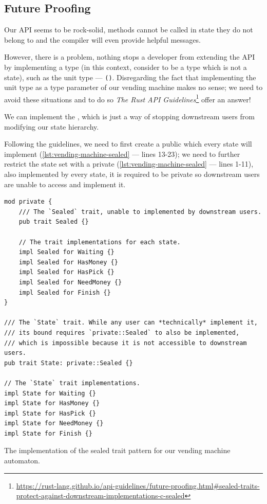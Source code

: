 \subsection{Future Proofing}\label{sec:typestates-hard-way:future}

Our \gls{API} seems to be rock-solid,
methods cannot be called in state they do not belong to and the compiler will even provide helpful messages.

However, there is a problem, nothing stops a developer from extending the \gls{API} by implementing a  type
(in this context, consider  to be a type which is not a state), such as the unit type --- \texttt{()}.
Disregarding the fact that implementing the unit type as a type parameter of our vending machine makes no sense;
we need to avoid these situations and to do so \emph{The Rust API Guidelines}\footnote{\url{https://rust-lang.github.io/api-guidelines/future-proofing.html\#sealed-traits-protect-against-downstream-implementations-c-sealed}} offer an answer! %

We can implement the ,
which is just a way of stopping downstream users from modifying our state hierarchy.

Following the guidelines, we need to first create a public  which every state will implement (\autoref{lst:vending-machine-sealed} --- lines 13-23);
we need to further restrict the state set with a private  (\autoref{lst:vending-machine-sealed} --- lines 1-11), also implemented by every state,
it is required to be private so downstream users are unable to access and implement it.

\begin{listing}
    \begin{verbatim}
mod private {
    /// The `Sealed` trait, unable to implemented by downstream users.
    pub trait Sealed {}

    // The trait implementations for each state.
    impl Sealed for Waiting {}
    impl Sealed for HasMoney {}
    impl Sealed for HasPick {}
    impl Sealed for NeedMoney {}
    impl Sealed for Finish {}
}

/// The `State` trait. While any user can *technically* implement it,
/// its bound requires `private::Sealed` to also be implemented,
/// which is impossible because it is not accessible to downstream users.
pub trait State: private::Sealed {}

// The `State` trait implementations.
impl State for Waiting {}
impl State for HasMoney {}
impl State for HasPick {}
impl State for NeedMoney {}
impl State for Finish {}
\end{verbatim}
    \caption{The implementation of the sealed trait pattern for our vending machine automaton.}
    \label{lst:vending-machine-sealed}
\end{listing}



